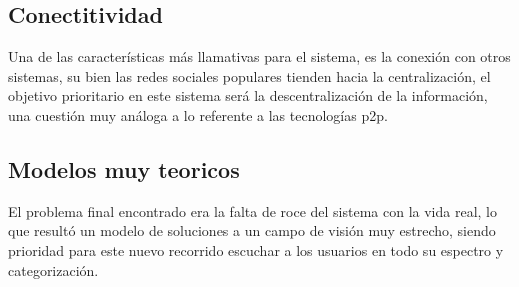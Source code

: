 \subsection{Conectitividad}
Una de las características más llamativas para el sistema, es la conexión con otros sistemas, su bien las redes sociales
populares tienden hacia la centralización, el objetivo prioritario en este sistema será la descentralización de la
información, una cuestión muy análoga a lo referente a las tecnologías p2p.

\subsection{Modelos muy teoricos}
El problema final encontrado era la falta de roce del sistema con la vida real, lo que resultó un modelo de soluciones a
un campo de visión muy estrecho, siendo prioridad para este nuevo recorrido escuchar a los usuarios en todo su espectro
y categorización.
